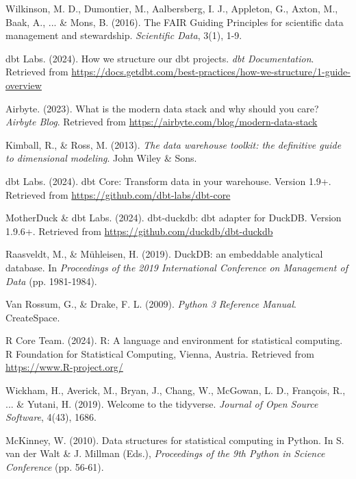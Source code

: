 \documentclass{article}
\begin{document}

\begin{thebibliography}{99}

Wilkinson, M. D., Dumontier, M., Aalbersberg, I. J., Appleton, G., Axton, M., Baak, A., ... \& Mons, B. (2016). The FAIR Guiding Principles for scientific data management and stewardship. \textit{Scientific Data}, 3(1), 1-9.

dbt Labs. (2024). How we structure our dbt projects. \textit{dbt Documentation}. Retrieved from \url{https://docs.getdbt.com/best-practices/how-we-structure/1-guide-overview}

Airbyte. (2023). What is the modern data stack and why should you care? \textit{Airbyte Blog}. Retrieved from \url{https://airbyte.com/blog/modern-data-stack}

Kimball, R., \& Ross, M. (2013). \textit{The data warehouse toolkit: the definitive guide to dimensional modeling}. John Wiley \& Sons.

dbt Labs. (2024). dbt Core: Transform data in your warehouse. Version 1.9+. Retrieved from \url{https://github.com/dbt-labs/dbt-core}

MotherDuck \& dbt Labs. (2024). dbt-duckdb: dbt adapter for DuckDB. Version 1.9.6+. Retrieved from \url{https://github.com/duckdb/dbt-duckdb}

Raasveldt, M., \& Mühleisen, H. (2019). DuckDB: an embeddable analytical database. In \textit{Proceedings of the 2019 International Conference on Management of Data} (pp. 1981-1984).

Van Rossum, G., \& Drake, F. L. (2009). \textit{Python 3 Reference Manual}. CreateSpace.

R Core Team. (2024). R: A language and environment for statistical computing. R Foundation for Statistical Computing, Vienna, Austria. Retrieved from \url{https://www.R-project.org/}

Wickham, H., Averick, M., Bryan, J., Chang, W., McGowan, L. D., François, R., ... \& Yutani, H. (2019). Welcome to the tidyverse. \textit{Journal of Open Source Software}, 4(43), 1686.

McKinney, W. (2010). Data structures for statistical computing in Python. In S. van der Walt \& J. Millman (Eds.), \textit{Proceedings of the 9th Python in Science Conference} (pp. 56-61).


\end{thebibliography}
\end{document}
